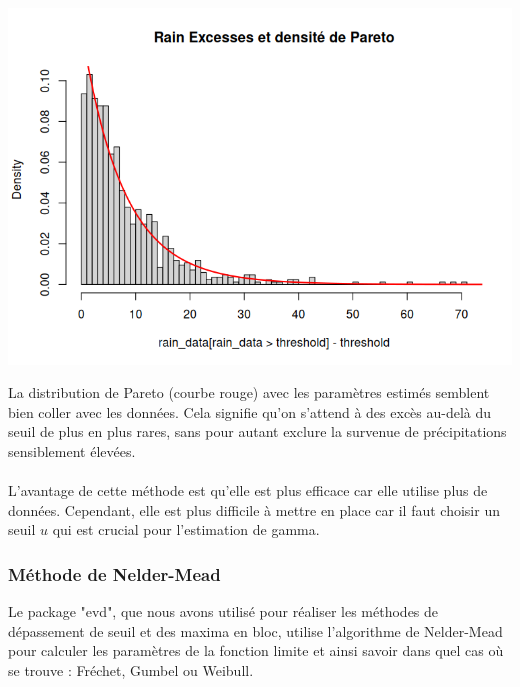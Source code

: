 \documentclass{article}
\begin{document}
\begin{center}
	\includegraphics[scale=0.8]{./images/rainhistodensite.png} 
\end{center}

La distribution de Pareto (courbe rouge) avec les paramètres estimés semblent bien coller avec les données. Cela signifie qu’on s’attend à des excès au-delà du seuil de plus en plus rares, sans pour autant exclure la survenue de précipitations sensiblement élevées.
\\
\\
L'avantage de cette méthode est qu'elle est plus efficace car elle utilise plus de données. Cependant, elle est plus difficile à mettre en place car il faut choisir un seuil $u$ qui est crucial pour l'estimation de gamma.


\subsubsection{Méthode de Nelder-Mead}

\noindent Le package "evd", que nous avons utilisé pour réaliser les méthodes de dépassement de seuil et des maxima en bloc, utilise l'algorithme de Nelder-Mead pour calculer les paramètres de la fonction limite et ainsi savoir dans quel cas où se trouve : Fréchet, Gumbel ou Weibull. \\
\end{document}
